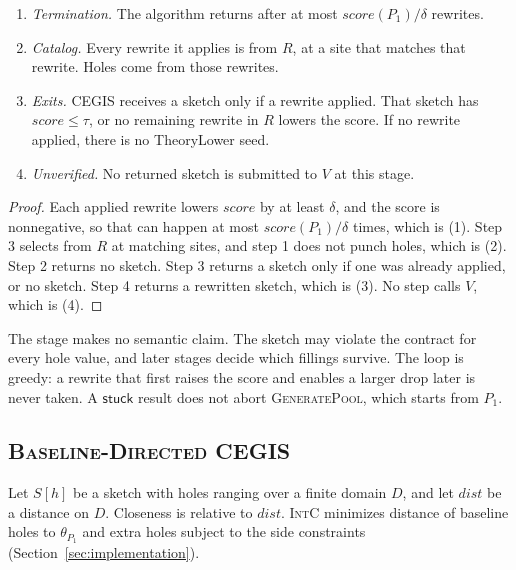 \begin{lemma}
\label{lem:theorylower}
\begin{enumerate}
  \item \emph{Termination.} The algorithm returns after at most
  \(\mathit{score}(P_1)/\delta\) rewrites.
  \item \emph{Catalog.} Every rewrite it applies is from \(R\), at a site
  that matches that rewrite. Holes come from those rewrites.
  \item \emph{Exits.} CEGIS receives a sketch only if a rewrite applied.
  That sketch has \(\mathit{score} \le \tau\), or no remaining rewrite in
  \(R\) lowers the score. If no rewrite applied, there is no TheoryLower
  seed.
  \item \emph{Unverified.} No returned sketch is submitted to \(V\) at this
  stage.
\end{enumerate}
\end{lemma}
\begin{proof}
Each applied rewrite lowers \(\mathit{score}\) by at least \(\delta\), and
the score is nonnegative, so that can happen at most
\(\mathit{score}(P_1)/\delta\) times, which is (1). Step 3 selects from
\(R\) at matching sites, and step 1 does not punch holes, which is (2).
Step 2 returns no sketch. Step 3 returns a sketch only if one was already
applied, or no sketch. Step 4 returns a rewritten sketch, which is (3).
No step calls \(V\), which is (4).
\end{proof}

The stage makes no semantic claim. The sketch may violate the contract for
every hole value, and later stages decide which fillings survive. The loop
is greedy: a rewrite that first raises the score and enables a larger drop
later is never taken. A \(\mathsf{stuck}\) result does not abort
\textsc{GeneratePool}, which starts from \(P_1\).

\subsection{\textsc{Baseline-Directed CEGIS}}

Let \(S[h]\) be a sketch with holes ranging over a finite domain \(D\), and
let \(\mathit{dist}\) be a distance on \(D\). Closeness is relative to
\(\mathit{dist}\). \textsc{IntC} minimizes distance of baseline holes to
\(\theta_{P_1}\) and extra holes subject to the side constraints
(Section~\ref{sec:implementation}).

